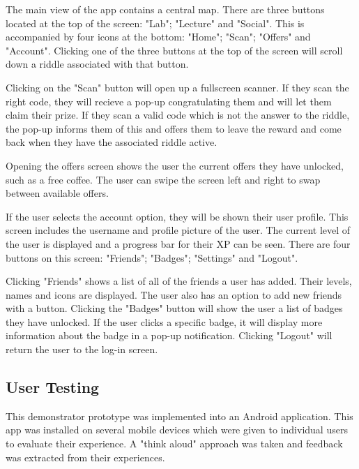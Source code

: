 \documentclass[10pt,twocolumn]{article} %
\begin{document}
The main view of the app contains a central map. There are three buttons located at the top of the screen: "Lab"; "Lecture" and "Social". This is accompanied by four icons at the bottom: "Home";  "Scan"; "Offers" and "Account". Clicking one of the three buttons at the top of the screen will scroll down a riddle associated with that button.

Clicking on the "Scan" button will open up a fullscreen scanner. If they scan the right code, they will recieve a pop-up congratulating them and will let them claim their prize. If they scan a valid code which is not the answer to the riddle, the pop-up informs them of this and offers them to leave the reward and come back when they have the associated riddle active.

Opening the offers screen shows the user the current offers they have unlocked, such as a free coffee. The user can swipe the screen left and right to swap between available offers.

If the user selects the account option, they will be shown their user profile. This screen includes the username and profile picture of the user. The current level of the user is displayed and a progress bar for their XP can be seen. There are four buttons on this screen: "Friends"; "Badges"; "Settings" and "Logout".

Clicking "Friends" shows a list of all of the friends a user has added. Their levels, names and icons are displayed. The user also has an option to add new friends with a button. Clicking the "Badges" button will show the user a list of badges they have unlocked. If the user clicks a specific badge, it will display more information about the badge in a pop-up notification. Clicking "Logout" will return the user to the log-in screen.

\subsection*{User Testing}
This demonstrator prototype was implemented into an Android application. This app was installed on several mobile devices which were given to individual users to evaluate their experience. A "think aloud" approach was taken and feedback was extracted from their experiences.
\end{document}
